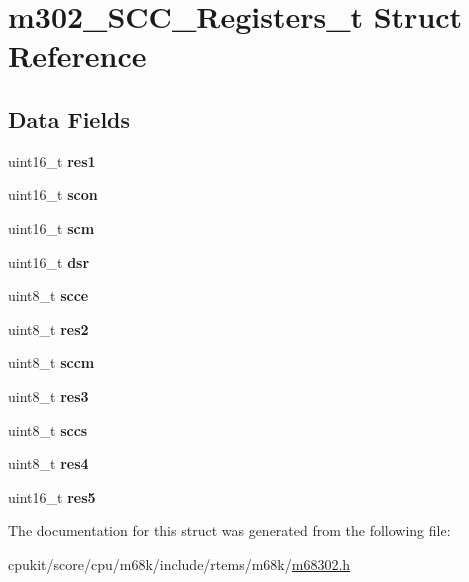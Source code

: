 \hypertarget{structm302__SCC__Registers__t}{}\section{m302\+\_\+\+S\+C\+C\+\_\+\+Registers\+\_\+t Struct Reference}
\label{structm302__SCC__Registers__t}
\subsection*{Data Fields}
\begin{DoxyCompactItemize}
\item 
\mbox{\label{structm302__SCC__Registers__t_ab112e72d182b7daa08c1988b328dd817}} 
uint16\+\_\+t {\bfseries res1}
\item 
\mbox{\label{structm302__SCC__Registers__t_ada58dd7a32dc7a4087b6b801263f8170}} 
uint16\+\_\+t {\bfseries scon}
\item 
\mbox{\label{structm302__SCC__Registers__t_a6e904e90477b1d998b878650e607bf90}} 
uint16\+\_\+t {\bfseries scm}
\item 
\mbox{\label{structm302__SCC__Registers__t_afe24af404a0ecef1a7da7e3adc5cd621}} 
uint16\+\_\+t {\bfseries dsr}
\item 
\mbox{\label{structm302__SCC__Registers__t_a430006265e3446f0552176871a96349f}} 
uint8\+\_\+t {\bfseries scce}
\item 
\mbox{\label{structm302__SCC__Registers__t_a1bd19d8a30446e6e34344082a88e3a97}} 
uint8\+\_\+t {\bfseries res2}
\item 
\mbox{\label{structm302__SCC__Registers__t_a0ce79df141ded53a2b87255f2d1f9961}} 
uint8\+\_\+t {\bfseries sccm}
\item 
\mbox{\label{structm302__SCC__Registers__t_a623cb76542860fc10ad00e0c7a1515b8}} 
uint8\+\_\+t {\bfseries res3}
\item 
\mbox{\label{structm302__SCC__Registers__t_a0ad3b71683b5235c725ab7afc4d0d091}} 
uint8\+\_\+t {\bfseries sccs}
\item 
\mbox{\label{structm302__SCC__Registers__t_a8f3c0385efff99c672b7266135a99976}} 
uint8\+\_\+t {\bfseries res4}
\item 
\mbox{\label{structm302__SCC__Registers__t_a13bd931077f78c310fe017b186e0d7c3}} 
uint16\+\_\+t {\bfseries res5}
\end{DoxyCompactItemize}


The documentation for this struct was generated from the following file\+:\begin{DoxyCompactItemize}
\item 
cpukit/score/cpu/m68k/include/rtems/m68k/\mbox{\hyperlink{m68302_8h}{m68302.\+h}}\end{DoxyCompactItemize}
